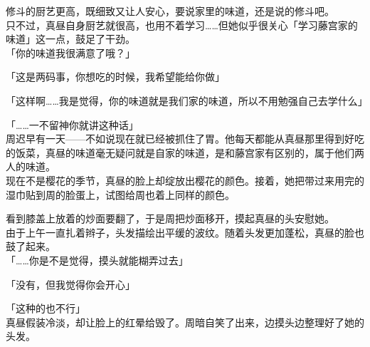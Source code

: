 修斗的厨艺更高，既细致又让人安心，要说家里的味道，还是说的修斗吧。\\

只不过，真昼自身厨艺就很高，也用不着学习……但她似乎很关心「学习藤宫家的味道」这一点，鼓足了干劲。\\

「你的味道我很满意了哦？」

「这是两码事，你想吃的时候，我希望能给你做」

「这样啊……我是觉得，你的味道就是我们家的味道，所以不用勉强自己去学什么」

「……一不留神你就讲这种话」\\

周迟早有一天——不如说现在就已经被抓住了胃。他每天都能从真昼那里得到好吃的饭菜，真昼的味道毫无疑问就是自家的味道，是和藤宫家有区别的，属于他们两人的味道。\\

现在不是樱花的季节，真昼的脸上却绽放出樱花的颜色。接着，她把带过来用完的湿巾贴到周的脸蛋上，试图给周也着上同样的颜色。

看到膝盖上放着的炒面要翻了，于是周把炒面移开，摸起真昼的头安慰她。\\

由于上午一直扎着辫子，头发描绘出平缓的波纹。随着头发更加蓬松，真昼的脸也鼓了起来。\\

「……你是不是觉得，摸头就能糊弄过去」

「没有，但我觉得你会开心」

「这种的也不行」\\

真昼假装冷淡，却让脸上的红晕给毁了。周暗自笑了出来，边摸头边整理好了她的头发。

